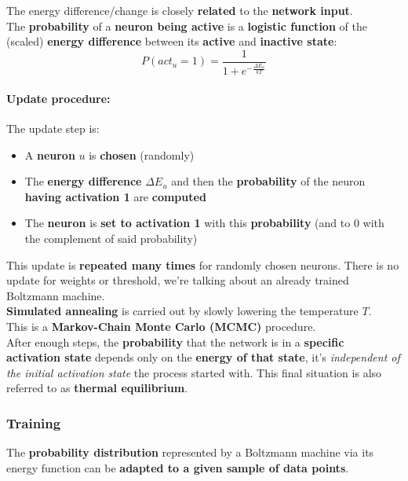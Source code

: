 \documentclass[11pt]{article}
\begin{document}
		The energy difference/change is closely \textbf{related} to the \textbf{network input}.\\
		
		The \textbf{probability} of a \textbf{neuron being active} is a \textbf{logistic function} of the (scaled) \textbf{energy difference} between its \textbf{active} and \textbf{inactive state}:
		$$ P(act_u = 1) = \frac{1}{1 + e^{- \frac{\Delta E_u}{kT}}} $$
		
		\paragraph{Update procedure:} The update step is:
		\begin{itemize}
			\item A \textbf{neuron} $u$ is \textbf{chosen} (randomly)
			\item The \textbf{energy difference} $\Delta E_u$ and then the \textbf{probability} of the neuron \textbf{having activation 1} are \textbf{computed}
			\item The \textbf{neuron} is \textbf{set to activation 1} with this \textbf{probability} (and to 0 with the complement of said probability)
		\end{itemize}
		
		This update is \textbf{repeated many times} for randomly chosen neurons. There is no update for weights or threshold, we're talking about an already trained Boltzmann machine.\\
		
		\textbf{Simulated annealing} is carried out by slowly lowering the temperature $T$. \\
		
		This is a \textbf{Markov-Chain Monte Carlo (MCMC)} procedure.\\
		
		After enough steps, the \textbf{probability} that the network is in a \textbf{specific activation state} depends only on the \textbf{energy of that state}, it's \textit{independent of the initial activation state} the process started with. This final situation is also referred to as \textbf{thermal equilibrium}.\\
		
		\newpage
		
		\subsubsection{Training}
		The \textbf{probability distribution} represented by a Boltzmann machine via its energy function can be \textbf{adapted to a given sample of data points}.\\
		
\end{document}
